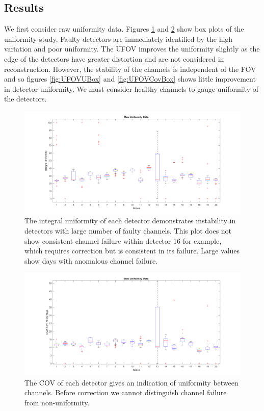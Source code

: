 \subsection{Results}
We first consider raw uniformity data. Figures \ref{fig:RawUBox} and \ref{fig:RawCovBox} show box plots of the uniformity study. Faulty detectors are immediately identified by the high variation and poor uniformity. The \acrshort{UFOV} improves the uniformity slightly as the edge of the detectors have greater distortion and are not considered in reconstruction. However, the stability of the channels is independent of the \acrshort{FOV} and so figures \ref{fig:UFOVUBox} and \ref{fig:UFOVCovBox} shows little improvement in detector uniformity. We must consider healthy channels to gauge uniformity of the detectors.

\begin{figure}[!t]
\centering
\includegraphics[width=5.6in]{figures/RawUBox.png}

    \caption{The integral uniformity of each detector demonstrates instability in detectors with large number of faulty channels. This plot does not show consistent channel failure within detector 16 for example, which requires correction but is consistent in its failure. Large values show days with anomalous channel failure. } \label{fig:RawUBox}
\end{figure}

\begin{figure}[!t]
\centering
\includegraphics[width=5.6in]{figures/RawCOVBox.png}

    \caption{The \acrshort{COV} of each detector gives an indication of uniformity between channels. Before correction we cannot distinguish channel failure from non-uniformity.} \label{fig:RawCovBox}
\end{figure}

